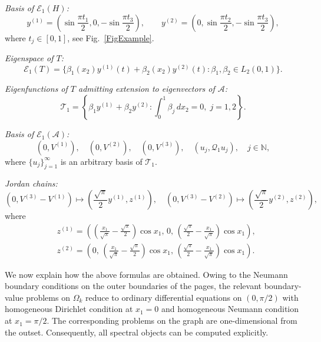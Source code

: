 \documentclass[reqno]{amsart}
\theoremstyle{definition}
\theoremstyle{remark}
\numberwithin{equation}{section}
\newcommand{\cA}{\mathcal{A}}
\newcommand{\cE}{\mathcal{E}}
\newcommand{\cT}{\mathcal{T}}
\newcommand{\cQ}{\mathcal{Q}}
\begin{document}
\medskip    
\noindent    
\textit{Basis of $\cE_1(H)$:}
    \begin{equation}\label{BaseY}
        y^{(1)}=\left(\sin\frac{\pi t_1}{2},0,-\sin\frac{\pi t_3}{2}\right),\qquad
        y^{(2)}=\left(0,\sin\frac{\pi t_2}{2},-\sin\frac{\pi t_3}{2}\right),
    \end{equation}
where $t_j\in[0,1]$, see Fig.~\ref{FigExample}. 

\medskip 
\noindent 
\textit{Eigenspace of $T$:} 
\begin{equation*}
  \cE_1(T)=\big\{\beta_1(x_2)y^{(1)}(t)+\beta_2(x_2)y^{(2)}(t)\colon \beta_1, \beta_2\in L_2(0,1) \big\}.
\end{equation*}

\medskip 
\noindent 
\textit{Eigenfunctions of $T$ admitting extension to eigenvectors of $\cA$:}
\begin{equation}\label{spaceTl}
    \cT_1=\left\{\beta_1y^{(1)}+\beta_2y^{(2)}\colon \int_0^1\beta_j\,dx_2=0,\;j=1,2\right\}.
\end{equation}


\medskip    
\noindent    
\textit{Basis of $\cE_1(\cA)$:}
    \begin{equation*}
        (0,V^{(1)}),\quad (0,V^{(2)}),\quad (0,V^{(3)}),\quad (u_j,\cQ_1u_j),\quad j\in\mathbb N,
    \end{equation*}
where $\{u_j\}_{j=1}^\infty$ is an arbitrary basis of $\cT_1$.

\medskip    
\noindent    
\textit{Jordan chains:}
\begin{equation*}
  \left(0,V^{(3)}-V^{(1)}\right)\longmapsto \left(\frac{\sqrt{\pi}}{2}y^{(1)},z^{(1)}\right),\quad
  \left(0,V^{(3)}-V^{(2)}\right)\longmapsto
\left(\frac{\sqrt{\pi}}{2}y^{(2)},z^{(2)}\right),
\end{equation*}
where 
\begin{align*}
&z^{(1)}=\left(
\left(\tfrac{x_1}{\sqrt{\pi}}-\tfrac{\sqrt{\pi}}{2}\right)\cos x_1,\,
0,\,
\left(\tfrac{\sqrt{\pi}}{2}-\tfrac{x_1}{\sqrt{\pi}}\right)\cos x_1
\right),\\
&z^{(2)}=\left(
0,\,
\left(\tfrac{x_1}{\sqrt{\pi}}-\tfrac{\sqrt{\pi}}{2}\right)\cos x_1,\,
\left(\tfrac{\sqrt{\pi}}{2}-\tfrac{x_1}{\sqrt{\pi}}\right)\cos x_1
\right).
\end{align*}

We now explain how the above formulas are obtained. Owing to the Neumann boundary conditions on the outer boundaries of the pages, the relevant
boundary-value problems on $\Omega_k$ reduce to ordinary differential equations on $(0,\pi/2)$ with homogeneous Dirichlet condition at $x_1=0$ and homogeneous Neumann condition at $x_1=\pi/2$. The corresponding problems on the graph are
one-dimensional from the outset. Consequently, all spectral objects can be computed explicitly.
\end{document}
